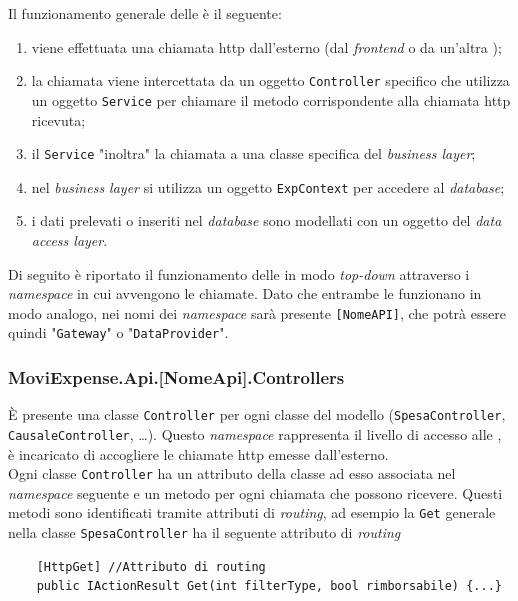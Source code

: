\noindent Il funzionamento generale delle  è il seguente:
\begin{enumerate}
    \item viene effettuata una chiamata http dall'esterno (dal \textit{frontend} o da un'altra );
    \item la chiamata viene intercettata da un oggetto \texttt{Controller} specifico che utilizza un oggetto \texttt{Service} per chiamare il metodo corrispondente alla chiamata http ricevuta;
    \item il \texttt{Service} "inoltra" la chiamata a una classe specifica del \textit{business layer};
    \item nel \textit{business layer} si utilizza un oggetto \texttt{ExpContext} per accedere al \textit{database};
    \item i dati prelevati o inseriti nel \textit{database} sono modellati con un oggetto del \textit{data access layer}.
\end{enumerate}

\noindent Di seguito è riportato il funzionamento delle  in modo \textit{top-down} attraverso i \textit{namespace} in cui avvengono le chiamate. Dato che entrambe le  funzionano in modo analogo, nei nomi dei \textit{namespace} sarà presente \texttt{[NomeAPI]}, che potrà essere quindi "\texttt{Gateway}" o "\texttt{DataProvider}".

\subsubsection{MoviExpense.Api.[NomeApi].Controllers}

È presente una classe \texttt{Controller} per ogni classe del modello (\texttt{SpesaController}, \texttt{CausaleController}, \dots). Questo \textit{namespace} rappresenta il livello di accesso alle , è incaricato di accogliere le chiamate http emesse dall'esterno.\\
Ogni classe \texttt{Controller} ha un attributo della classe ad esso associata nel \textit{namespace} seguente e un metodo per ogni chiamata che possono ricevere. Questi metodi sono identificati tramite attributi di \textit{routing}, ad esempio la \texttt{Get} generale nella classe \texttt{SpesaController} ha il seguente attributo di \textit{routing}

\begin{verbatim}
    [HttpGet] //Attributo di routing
    public IActionResult Get(int filterType, bool rimborsabile) {...}
\end{verbatim}

